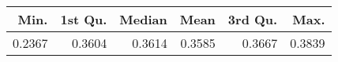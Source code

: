 \begin{table}[ht]
\centering
\begin{tabular}{rrrrrr}
  \hline
Min. & 1st Qu. & Median & Mean & 3rd Qu. & Max. \\ 
  \hline
0.2367 & 0.3604 & 0.3614 & 0.3585 & 0.3667 & 0.3839 \\ 
   \hline
\end{tabular}
\end{table}
